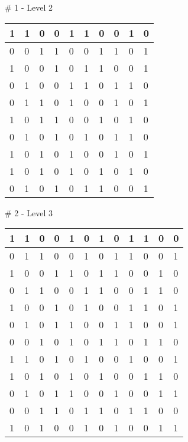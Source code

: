 \# 1 - Level 2 \newline
\begin{tabular}{|m{\collen}|m{\collen}|m{\collen}|m{\collen}|m{\collen}|m{\collen}|m{\collen}|m{\collen}|m{\collen}|m{\collen}|}
\hline
  1 & 1 & 0 & 0 & 1 & 1 & 0 & 0 & 1 & 0 \\
\hline
  0 & 0 & 1 & 1 & 0 & 0 & 1 & 1 & 0 & 1 \\
\hline
  1 & 0 & 0 & 1 & 0 & 1 & 1 & 0 & 0 & 1 \\
\hline
  0 & 1 & 0 & 0 & 1 & 1 & 0 & 1 & 1 & 0 \\
\hline
  0 & 1 & 1 & 0 & 1 & 0 & 0 & 1 & 0 & 1 \\
\hline
  1 & 0 & 1 & 1 & 0 & 0 & 1 & 0 & 1 & 0 \\
\hline
  0 & 1 & 0 & 1 & 0 & 1 & 0 & 1 & 1 & 0 \\
\hline
  1 & 0 & 1 & 0 & 1 & 0 & 0 & 1 & 0 & 1 \\
\hline
  1 & 0 & 1 & 0 & 1 & 0 & 1 & 0 & 1 & 0 \\
\hline
  0 & 1 & 0 & 1 & 0 & 1 & 1 & 0 & 0 & 1 \\
\hline
\end{tabular}


\smallskip

\# 2 - Level 3 \newline
\begin{tabular}{|m{\collen}|m{\collen}|m{\collen}|m{\collen}|m{\collen}|m{\collen}|m{\collen}|m{\collen}|m{\collen}|m{\collen}|m{\collen}|m{\collen}|}
\hline
  1 & 1 & 0 & 0 & 1 & 0 & 1 & 0 & 1 & 1 & 0 & 0 \\
\hline
  0 & 1 & 1 & 0 & 0 & 1 & 0 & 1 & 1 & 0 & 0 & 1 \\
\hline
  1 & 0 & 0 & 1 & 1 & 0 & 1 & 1 & 0 & 0 & 1 & 0 \\
\hline
  0 & 1 & 1 & 0 & 0 & 1 & 1 & 0 & 0 & 1 & 1 & 0 \\
\hline
  1 & 0 & 0 & 1 & 0 & 1 & 0 & 0 & 1 & 1 & 0 & 1 \\
\hline
  0 & 1 & 0 & 1 & 1 & 0 & 0 & 1 & 1 & 0 & 0 & 1 \\
\hline
  0 & 0 & 1 & 0 & 1 & 0 & 1 & 1 & 0 & 1 & 1 & 0 \\
\hline
  1 & 1 & 0 & 1 & 0 & 1 & 0 & 0 & 1 & 0 & 0 & 1 \\
\hline
  1 & 0 & 1 & 0 & 1 & 0 & 1 & 0 & 0 & 1 & 1 & 0 \\
\hline
  0 & 1 & 0 & 1 & 1 & 0 & 0 & 1 & 0 & 0 & 1 & 1 \\
\hline
  0 & 0 & 1 & 1 & 0 & 1 & 1 & 0 & 1 & 1 & 0 & 0 \\
\hline
  1 & 0 & 1 & 0 & 0 & 1 & 0 & 1 & 0 & 0 & 1 & 1 \\
\hline
\end{tabular}


